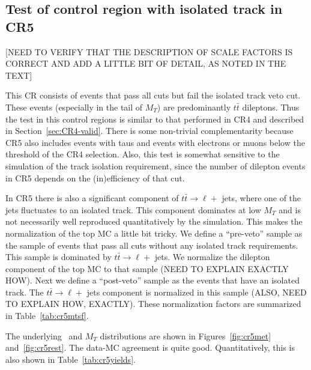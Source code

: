 \subsection{Test of control region with isolated track in CR5}
\label{sec:CR5}

[NEED TO VERIFY THAT THE DESCRIPTION OF SCALE FACTORS IS CORRECT AND
ADD A LITTLE BIT OF DETAIL, AS NOTED IN THE TEXT]

This CR consists of events that pass all cuts but fail the isolated
track veto cut.  These events (especially in the tail of $M_T$) are 
predominantly $t\bar{t}$ dileptons.  Thus the test in this control
regions is similar to that performed in CR4 and described
in Section~\ref{sec:CR4-valid}.  There is some non-trivial 
complementarity because CR5 also includes events with 
taus and events with electrons or muons below the threshold of
the CR4 selection.  Also, this test is somewhat sensitive to
the simulation of the track isolation requirement, since the
number of dilepton events in CR5 depends on the (in)efficiency 
of that cut.



In CR5 there is also a significant component
of $t\bar{t} \to \ell +$ jets, where one of the jets fluctuates
to an isolated track.  This component dominates at low $M_T$
and is not necessarily well reproduced quantitatively by the 
simulation.  This makes the normalization of the top MC a little bit tricky.
We define a ``pre-veto'' sample as the sample of events that pass
all cuts without any isolated track requirements.  This sample is
dominated by $t\bar{t} \to \ell +$ jets.  We normalize the dilepton
component of the top MC to that sample (NEED TO EXPLAIN EXACTLY HOW).
Next we define a ``post-veto'' sample as the events that have an
isolated track.  The $t\bar{t} \to \ell +$ jets component is 
normalized in this sample (ALSO, NEED TO EXPLAIN HOW, EXACTLY).
These normalization factors are summarized in Table~\ref{tab:cr5mtsf}.

The underlying \met\ and $M_T$ distributions are shown in 
Figures~\ref{fig:cr5met} and~\ref{fig:cr5rest}.  The data-MC agreement
is quite good.  Quantitatively, this is also shown in Table~\ref{tab:cr5yields}.


